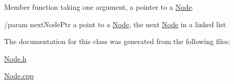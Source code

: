 Member function taking one argument, a pointer to a \hyperlink{classNode}{Node}. 

/param next\+Node\+Ptr a point to a \hyperlink{classNode}{Node}, the next \hyperlink{classNode}{Node} in a linked list 

The documentation for this class was generated from the following files\+:\begin{DoxyCompactItemize}
\item 
\hyperlink{Node_8h}{Node.\+h}\item 
\hyperlink{Node_8cpp}{Node.\+cpp}\end{DoxyCompactItemize}
